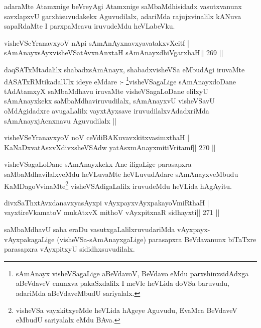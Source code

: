 \begin{artha}
adaraMte Atamxnige beVreyAgi Atamxnige saMbaMdhisidadx vasutxvanunx savxlapxvU garxhisuvudakekx Aguvudilalx, adariMda rajujxvinalilx kANuva sapaRdaMte I parxpaMcavu iruvudeMdu heVLabeVku.
\end{artha}

\begin{shl}
visheVSeYranavxyoV nApi sAmAnAyxnavxyavatakxvXcitf |
sAmAnayxsAyxvisheVSatAvxnAnxtaH sAmAnayxdhiVgarxhaH\hfill || 269 ||
\end{shl}

\begin{artha}
daqSATxMtadalilx shabadxsAmAnayx, shabadxvisheVSa eMbudAgi iruvaMte dASATxRMtikadalUlx ideye eMdare :- \footnote{sAmAnayx visheVSagaLige aBeVdavoV, BeVdavo eMdu parxshinxsidAdxga aBeVdaveV enunxva pakaSxdalilx I meVle heVLida doVSa baruvudu, adariMda aBeVdaveMbudU sariyalalx.}visheVSagaLige sAmAnayxdoDane tAdAtamxyX saMbaMdhavu iruvaMte visheVSagaLoDane elilxyU sAmAnayxkekx saMbaMdhaviruvudilalx, sAmAnayxvU visheVSavU oMdAgidadxre avugaLalilx vayxtAyxsave iruvudilalxvAdadxriMda sAmAnayxjAcnxnavu Aguvudilalx || 
\end{artha}


\begin{shl}
visheVSeYranavxyoV noV ceVdiBAKuvavxkitxvasimxthaH |
KaNaDxvatAsxvXdivxsheVSAdw yatAsxmAnayxmitiVritamf\hfill || 270 ||
\end{shl}

\begin{artha}
visheVSagaLoDane sAmAnayxkekx Ane-iligaLige parasapxra saMbaMdhavilalxveMdu heVLuvaMte heVLuvudAdare sAmAnayxveMbudu KaMDagoVvinaMte\footnote{visheVSa vayxkitxyeMde heVLida hAgeye Aguvudu, EvaMca BeVdaveV eMbudU sariyalalx eMdu BAva.} visheVSAdigaLalilx iruvudeMdu heVLida hAgAyitu.
\end{artha}


\begin{shl}
divxSaThxtAvxdanavxyasAyxpi vAyxpayxvAyxpakayoVmiRthaH |
vayxtireVkamatoV mukAtxvX mithoV vAyxpitxnaR sidhayxti\hfill || 271 ||
\end{shl}

\begin{artha}
saMbaMdhavU saha eraDu vasutxgaLalilxruvudariMda vAyxpayx-vAyxpakagaLige (visheVSa-sAmAnayxgaLige) parasapxra BeVdavanunx biTaTxre parasapxra vAyxpitxyU sididhxsuvudilalx.
\end{artha}

